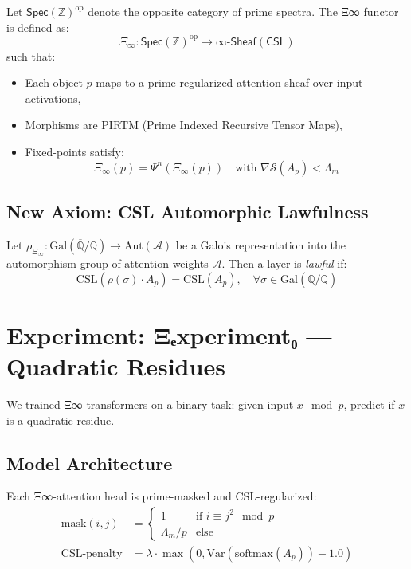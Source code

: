 \documentclass[12pt]{article}
\begin{document}
\begin{definition}[Ξ∞ Functor]
Let $\mathsf{Spec}(\mathbb{Z})^\mathrm{op}$ denote the opposite category of prime spectra. The Ξ∞ functor is defined as:
\[
\Xi_\infty : \mathsf{Spec}(\mathbb{Z})^\mathrm{op} \longrightarrow \infty\text{-}\mathsf{Sheaf}(\mathsf{CSL})
\]
such that:
\begin{itemize}[noitemsep]
  \item Each object $p$ maps to a prime-regularized attention sheaf over input activations,
  \item Morphisms are PIRTM (Prime Indexed Recursive Tensor Maps),
  \item Fixed-points satisfy:
  \[
  \Xi_\infty(p) = \Psi^{n}(\Xi_\infty(p)) \quad \text{with } \nabla \mathcal{S}(A_p) < \Lambda_m
  \]
\end{itemize}
\end{definition}

\subsection{New Axiom: CSL Automorphic Lawfulness}
\begin{axiom}
Let $\rho_{\Xi_\infty}: \mathrm{Gal}(\overline{\mathbb{Q}}/\mathbb{Q}) \to \mathrm{Aut}(\mathcal{A})$ be a Galois representation into the automorphism group of attention weights $\mathcal{A}$. Then a layer is \emph{lawful} if:
\[
\mathrm{CSL}(\rho(\sigma) \cdot A_p) = \mathrm{CSL}(A_p), \quad \forall \sigma \in \mathrm{Gal}(\overline{\mathbb{Q}}/\mathbb{Q})
\]
\end{axiom}

\section{Experiment: Ξₑxperiment₀ — Quadratic Residues}

We trained Ξ∞-transformers on a binary task: given input $x \mod p$, predict if $x$ is a quadratic residue. 

\subsection{Model Architecture}

Each Ξ∞-attention head is prime-masked and CSL-regularized:
\begin{align*}
\text{mask}(i, j) &= \begin{cases}
1 & \text{if } i \equiv j^2 \mod p \\
\Lambda_m / p & \text{else}
\end{cases} \\
\text{CSL-penalty} &= \lambda \cdot \max(0, \mathrm{Var}(\text{softmax}(A_p)) - 1.0)
\end{align*}
\end{document}
